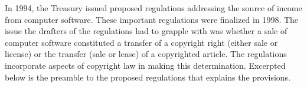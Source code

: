 


In 1994, the Treasury issued proposed regulations addressing the source of income from computer software.  These important regulations were finalized in 1998.  The issue the drafters of the regulations had to grapple with was whether a sale of computer software constituted a transfer of a copyright right (either sale or license) or the transfer (sale or lease) of a copyrighted article.  The regulations incorporate aspects of copyright law in making this determination.  Excerpted below is the preamble to the proposed regulations that explains the provisions. 

